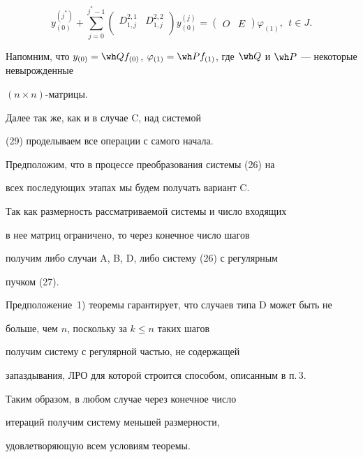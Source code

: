 \begin{pf}
\begin{equation}
y_{(0)}^{(j^*)}+\sum_{j=0}^{j^*-1} {


\begin{pmatrix}


 D_{1,j}^{2,1} & D_{1,j}^{2,2} \\


\end{pmatrix} y_{(0)}^{(j)}}=


\begin{pmatrix}  O & E


\end{pmatrix} \varphi_{(1)},\ \ t \in J.


\end{equation}


Напомним, что $y_{(0)}=\wh Q f_{(0)}$, $\varphi_{(1)}=


\wh P f_{(1)}$, где $\wh Q$ и $\wh P$ --- некоторые невырожденные 


$(n \times n)$-матрицы.





Далее так же, как и в случае C, над системой


(29) проделываем все операции с самого начала.





Предположим, что в процессе преобразования системы (26) на


всех последующих этапах мы будем получать вариант C.


Так как размерность рассматриваемой системы и число входящих


в нее матриц ограничено, то через конечное число шагов


получим либо случаи A, B, D, либо систему (26) с регулярным 


пучком (27).


Предположение~1) теоремы гарантирует, что случаев типа D может быть не 


больше, чем $n$, поскольку за $k\le n$ таких шагов 


получим систему с регулярной частью, не содержащей


запаздывания, ЛРО для которой строится способом, описанным в п.\,3.


Таким образом, в любом случае через конечное число


итераций получим систему меньшей размерности,


удовлетворяющую всем условиям теоремы. 






\end{pf}
